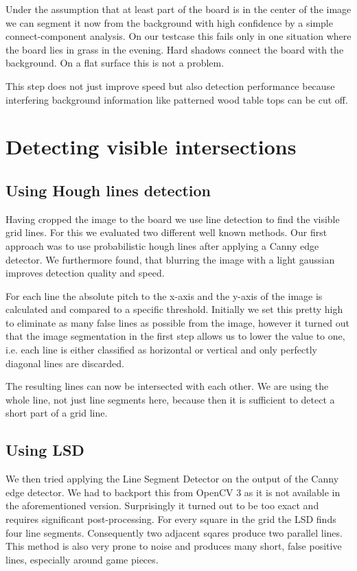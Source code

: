 	Under the assumption that at least part of the board is in the center of the image we can segment it now from the background with high confidence by a simple connect-component analysis. On our testcase this fails only in one situation where the board lies in grass in the evening. Hard shadows connect the board with the background. On a flat surface this is not a problem.

	This step does not just improve speed but also detection performance because interfering background information like patterned wood table tops can be cut off.

	\section{Detecting visible intersections}
	\subsection{Using Hough lines detection}
	Having cropped the image to the board we use line detection to find the visible grid lines. For this we evaluated two different well known methods. Our first approach was to use probabilistic hough lines after applying a Canny edge detector. We furthermore found, that blurring the image with a light gaussian improves detection quality and speed.

	For each line the absolute pitch to the x-axis and the y-axis of the image is calculated and compared to a specific threshold. Initially we set this pretty high to eliminate as many false lines as possible from the image, however it turned out that the image segmentation in the first step allows us to lower the value to one, i.e. each line is either classified as horizontal or vertical and only perfectly diagonal lines are discarded.

	The resulting lines can now be intersected with each other. We are using the whole line, not just line segments here, because then it is sufficient to detect a short part of a grid line.

	\subsection{Using LSD}
	We then tried applying the Line Segment Detector \cite{} on the output of the Canny edge detector. We had to backport this from OpenCV 3 as it is not available in the aforementioned version. Surprisingly it turned out to be too exact and requires significant post-processing. For every square in the grid the LSD finds four line segments. Consequently two adjacent sqares produce two parallel lines. This method is also very prone to noise and produces many short, false positive lines, especially around game pieces.

